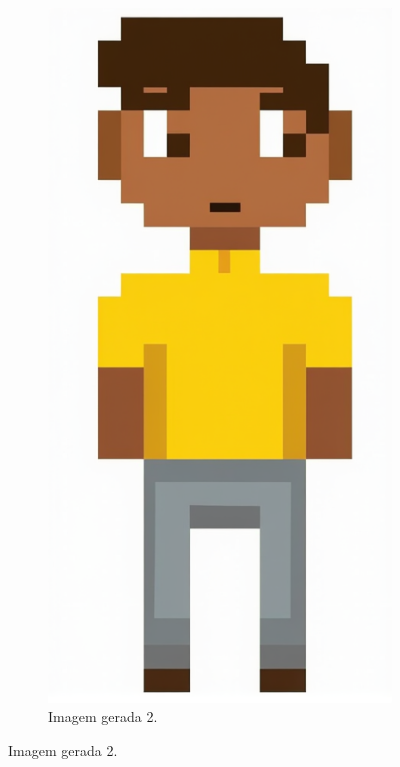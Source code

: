 \begin{figure}[htbp]
\begin{subfigure}{0.25\linewidth}
        \includegraphics[width=1\linewidth]{figs/cgDream/res_img_fluxDev1b.png}
        \caption{\small Imagem gerada 2.}
        \label{fig:cgDream1c}
    \end{subfigure}
\end{figure}

